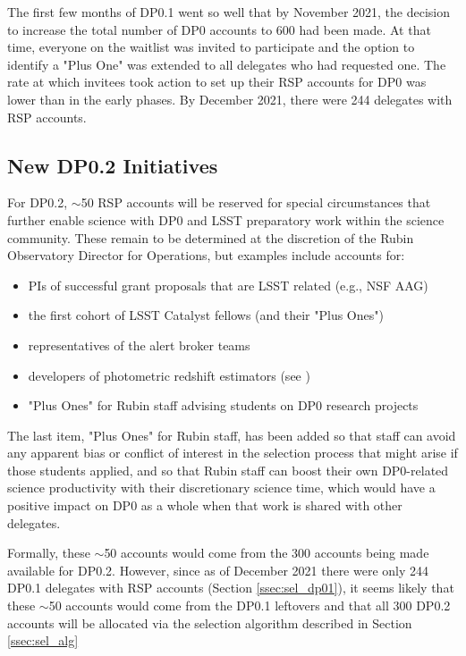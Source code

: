 \documentclass[DM,lsstdraft,authoryear,toc]{lsstdoc}
\begin{document}
The first few months of DP0.1 went so well that by November 2021, the decision to increase the total number of DP0 accounts to 600 had been made.
At that time, everyone on the waitlist was invited to participate and the option to identify a "Plus One" was extended to all delegates who had requested one.
The rate at which invitees took action to set up their RSP accounts for DP0 was lower than in the early phases.
By December 2021, there were 244 delegates with RSP accounts.


\subsection{New DP0.2 Initiatives}\label{ssec:sel_dp02}

For DP0.2, $\sim$50 RSP accounts will be reserved for special circumstances that further enable science with DP0 and LSST preparatory work within the science community.
These remain to be determined at the discretion of the Rubin Observatory Director for Operations, but examples include accounts for:
\begin{itemize}
\item PIs of successful grant proposals that are LSST related (e.g., NSF AAG)
\item the first cohort of LSST Catalyst fellows (and their "Plus Ones")
\item representatives of the alert broker teams
\item developers of photometric redshift estimators (see )
\item "Plus Ones" for Rubin staff advising students on DP0 research projects
\end{itemize}

The last item, "Plus Ones" for Rubin staff, has been added so that staff can avoid any apparent bias or conflict of interest in the selection process that might arise if those students applied, and so that Rubin staff can boost their own DP0-related science productivity with their discretionary science time, which would have a positive impact on DP0 as a whole when that work is shared with other delegates.

Formally, these $\sim$50 accounts would come from the 300 accounts being made available for DP0.2.
However, since as of December 2021 there were only 244 DP0.1 delegates with RSP accounts (Section \ref{ssec:sel_dp01}), it seems likely that these $\sim$50 accounts would come from the DP0.1 leftovers and that all 300 DP0.2 accounts will be allocated via the selection algorithm described in Section \ref{ssec:sel_alg}
\end{document}
